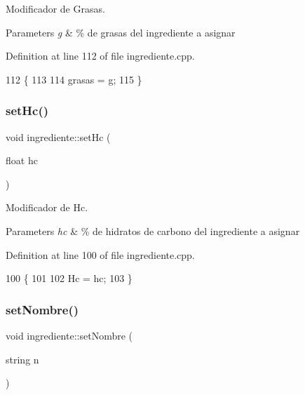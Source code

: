 Modificador de Grasas. 


\begin{DoxyParams}{Parameters}
{\em g} & \% de grasas del ingrediente a asignar \\
\hline
\end{DoxyParams}


Definition at line 112 of file ingrediente.\+cpp.


\begin{DoxyCode}
112                                   \{
113 
114     grasas = g;
115 \}
\end{DoxyCode}
\mbox{\label{classingrediente_ad335883ec2bbe4e02cc6422c503944e3}} 
\subsubsection{\texorpdfstring{set\+Hc()}{setHc()}}
{\footnotesize\ttfamily void ingrediente\+::set\+Hc (\begin{DoxyParamCaption}\item[{float}]{hc }\end{DoxyParamCaption})}



Modificador de Hc. 


\begin{DoxyParams}{Parameters}
{\em hc} & \% de hidratos de carbono del ingrediente a asignar \\
\hline
\end{DoxyParams}


Definition at line 100 of file ingrediente.\+cpp.


\begin{DoxyCode}
100                                \{
101 
102     Hc = hc;
103 \}
\end{DoxyCode}
\mbox{\label{classingrediente_aac5aba3c36aa762c72a8bc38271e4c12}} 
\subsubsection{\texorpdfstring{set\+Nombre()}{setNombre()}}
{\footnotesize\ttfamily void ingrediente\+::set\+Nombre (\begin{DoxyParamCaption}\item[{string}]{n }\end{DoxyParamCaption})}



